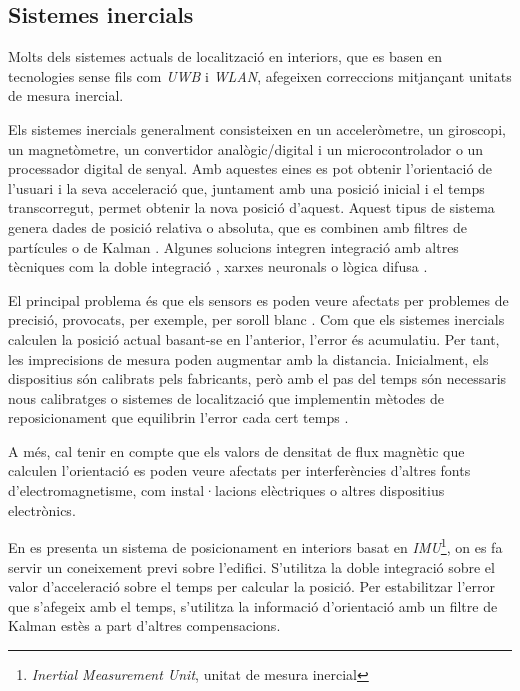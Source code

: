 \subsection{Sistemes inercials}

Molts dels sistemes actuals de localització en interiors, que es basen en tecnologies sense fils com \textit{UWB} i \textit{WLAN}, afegeixen correccions mitjançant unitats de mesura inercial.

Els sistemes inercials generalment consisteixen en un acceleròmetre, un giroscopi, un magnetòmetre, un convertidor analògic/digital i un microcontrolador o un processador digital de senyal. Amb aquestes eines es pot obtenir l'orientació de l’usuari i la seva acceleració que, juntament amb una posició inicial i el temps transcorregut, permet obtenir la nova posició d’aquest. Aquest tipus de sistema genera dades de posició relativa o absoluta, que es combinen amb filtres de partícules o de Kalman \cite{vilaseca}. Algunes solucions integren integració amb altres tècniques com la doble integració \cite{negard}, xarxes neuronals \cite{beauregard} o lògica difusa \cite{tome} \cite{garcia}.

El principal problema és que els sensors es poden veure afectats per problemes de precisió, provocats, per exemple, per soroll blanc \cite{vilaseca}. Com que els sistemes inercials calculen la posició actual basant-se en l'anterior, l’error és acumulatiu. Per tant, les imprecisions de mesura poden augmentar amb la distancia. Inicialment, els dispositius són calibrats pels fabricants, però amb el pas del temps són necessaris nous calibratges o sistemes de localització que implementin mètodes de reposicionament que equilibrin l'error cada cert temps \cite{glanzer}.

A més, cal tenir en compte que els valors de densitat de flux magnètic que calculen l'orientació es poden veure afectats per interferències d’altres fonts d’electromagnetisme, com instal·lacions elèctriques o altres dispositius electrònics.

En \cite{glanzer} es presenta un sistema de posicionament en interiors basat en \textit{IMU}\footnote{\textit{Inertial Measurement Unit}, unitat de mesura inercial}, on es fa servir un coneixement previ sobre l’edifici. S’utilitza la doble integració sobre el valor d'acceleració sobre el temps per calcular la posició. Per estabilitzar l'error que s'afegeix amb el temps, s'utilitza la informació d'orientació amb un filtre de Kalman estès a part d'altres compensacions.

